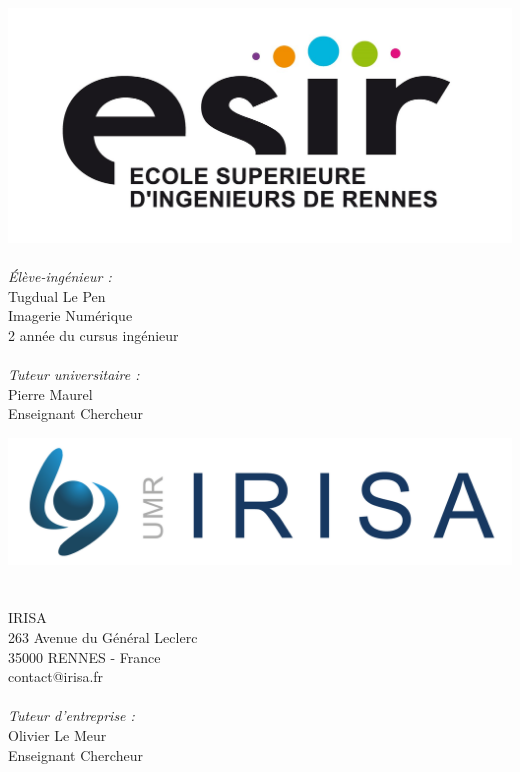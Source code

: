 \begin{titlepage}
  \begin{center}

    \begin{minipage}{0.45\textwidth}
      \begin{flushleft} \large
        \includegraphics[width=0.9\columnwidth]{datas/logo_esir.jpg}~\\
        \emph{Élève-ingénieur :}\\
        Tugdual Le Pen\\
        Imagerie Numérique\\
        2 année du cursus ingénieur\\
        ~\\
        \emph{Tuteur universitaire :}\\
        Pierre Maurel\\
        Enseignant Chercheur
      \end{flushleft}
    \end{minipage}
    \begin{minipage}{0.45\textwidth}
      \begin{flushright} \large
        \vspace{19pt}
        \includegraphics[width=0.9\columnwidth]{datas/logo_irisa.jpg}~\\~\\
        IRISA\\
        263 Avenue du Général Leclerc\\
        35000 RENNES - France\\
        contact@irisa.fr\\
        ~\\        
        \emph{Tuteur d'entreprise :}\\
        Olivier Le Meur\\
        Enseignant Chercheur\\
      \end{flushright}
    \end{minipage}


\end{center}
\end{titlepage}

